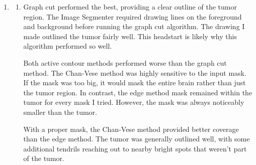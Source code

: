 \documentclass{article}
\begin{document}
\begin{enumerate}
    The Euler-Lagrange equation is:
    

    \begin{align*}
        \frac{\delta F}{\delta u} - \operatorname{div} \left( \frac{\delta F}{\delta \nabla u} \right) &= 0 \\
        1 - \frac{u_0}{u} - \operatorname{div} \left( \alpha \frac{\nabla u}{| \nabla u |} \right) &= 0 \\
    \end{align*}

    \item
    \begin{enumerate}
        \item[(c)]
        Graph cut performed the best, providing a clear outline of the tumor region. The Image
        Segmenter required drawing lines on the foreground and background before running the
        graph cut algorithm. The drawing I made outlined the tumor fairly well. This headstart
        is likely why this algorithm performed so well.

        Both active contour methods performed worse than the graph cut method.
        The Chan-Vese method was highly sensitive to the input mask.
        If the mask was too big, it would mask the entire brain rather than just the tumor region.
        In contrast, the edge method mask remained within the tumor for every mask I tried.
        However, the mask was always noticeably smaller than the tumor.
        
        With a proper mask, the Chan-Vese method provided better coverage than the edge method.
        The tumor was generally outlined well, with some additional tendrils
        reaching out to nearby bright spots that weren't part of the tumor.
    \end{enumerate}

\end{enumerate}
\end{document}
